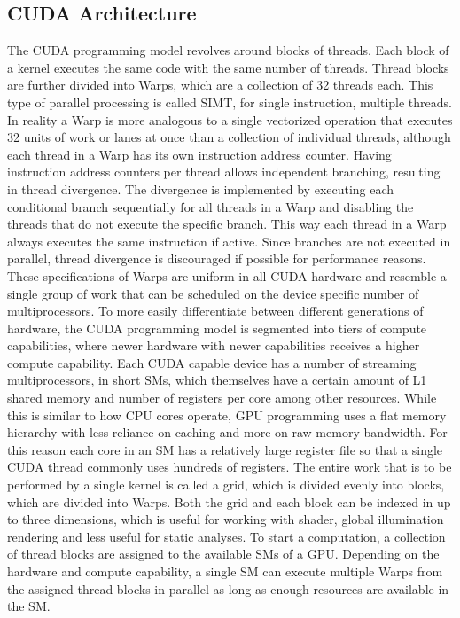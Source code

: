 \subsection{CUDA Architecture}
The CUDA programming model revolves around blocks of threads. Each block of a kernel executes the same code with the same number of threads.
Thread blocks are further divided into Warps, which are a collection of 32 threads each. This type of parallel processing is called SIMT, for single instruction, multiple threads.
In reality a Warp is more analogous to a single vectorized operation that executes 32 units of work or lanes at once than a collection of individual threads, although each thread in a Warp has its own instruction address counter. Having instruction address counters per thread allows independent branching, resulting in thread divergence. The divergence is implemented by executing each conditional branch sequentially for all threads in a Warp and disabling the threads that do not execute the specific branch.
This way each thread in a Warp always executes the same instruction if active. Since branches are not executed in parallel, thread divergence is discouraged if possible for performance reasons.
These specifications of Warps are uniform in all CUDA hardware and resemble a single group of work that can be scheduled on the device specific number of multiprocessors.
To more easily differentiate between different generations of hardware, the CUDA programming model is segmented into tiers of compute capabilities, where newer hardware with newer capabilities receives a higher compute capability.
Each CUDA capable device has a number of streaming multiprocessors, in short SMs, which themselves have a certain amount of L1 shared memory and number of registers per core among other resources. 
While this is similar to how CPU cores operate, GPU programming uses a flat memory hierarchy with less reliance on caching and more on raw memory bandwidth. For this reason each core in an SM has a relatively large register file so that a single CUDA thread commonly uses hundreds of registers.
The entire work that is to be performed by a single kernel is called a grid, which is divided evenly into blocks, which are divided into Warps. Both the grid and each block can be indexed in up to three dimensions, which is useful for working with shader, global illumination rendering and less useful for static analyses.
To start a computation, a collection of thread blocks are assigned to the available SMs of a GPU. Depending on the hardware and compute capability, a single SM can execute multiple Warps from the assigned thread blocks in parallel as long as enough resources are available in the SM.
